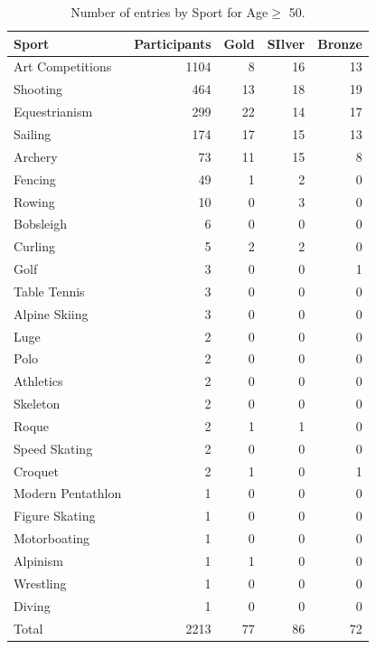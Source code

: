 \documentclass[11pt]{article} %
\begin{document}
\begin{table}
\centering
\begin{tabular}{lrrrr}
\toprule
Sport &  Participants &  Gold & SIlver & Bronze\\
\midrule
Art Competitions  &   1104 &      8 &     16 &     13 \\
Shooting          &    464 &     13 &     18 &     19 \\
Equestrianism     &    299 &     22 &     14 &     17 \\
Sailing           &    174 &     17 &     15 &     13 \\
Archery           &     73 &     11 &     15 &      8 \\
Fencing           &     49 &      1 &      2 &      0 \\
Rowing            &     10 &      0 &      3 &      0 \\
Bobsleigh         &      6 &      0 &      0 &      0 \\
Curling           &      5 &      2 &      2 &      0 \\
Golf              &      3 &      0 &      0 &      1 \\
Table Tennis      &      3 &      0 &      0 &      0 \\
Alpine Skiing     &      3 &      0 &      0 &      0 \\
Luge              &      2 &      0 &      0 &      0 \\
Polo              &      2 &      0 &      0 &      0 \\
Athletics         &      2 &      0 &      0 &      0 \\
Skeleton          &      2 &      0 &      0 &      0 \\
Roque             &      2 &      1 &      1 &      0 \\
Speed Skating     &      2 &      0 &      0 &      0 \\
Croquet           &      2 &      1 &      0 &      1 \\
Modern Pentathlon &      1 &      0 &      0 &      0 \\
Figure Skating    &      1 &      0 &      0 &      0 \\
Motorboating      &      1 &      0 &      0 &      0 \\
Alpinism          &      1 &      1 &      0 &      0 \\
Wrestling         &      1 &      0 &      0 &      0 \\
Diving            &      1 &      0 &      0 &      0 \\
\midrule
Total             & 2213 & 77 & 86 & 72 \\
\bottomrule
\end{tabular}
\caption{Number of entries by Sport for Age$\geq$ 50.}
\end{table}
\end{document}
